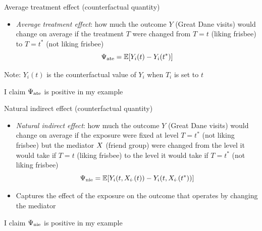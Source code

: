 \documentclass{beamer}
\theoremstyle{remark}
\begin{document}
\begin{frame}{Average treatment effect (counterfactual quantity)}

    \begin{itemize}
        \item \emph{Average treatment effect}: how much the outcome $Y$ (Great Dane visits) would change on average if the treatment $T$ were changed from $T = t$ (liking frisbee) to $T = t^*$ (not liking frisbee)
              \begin{equation*}
                  \ate = \E{Y_i(t) - Y_i(t^*)}
              \end{equation*}
    \end{itemize}

    Note: $Y_i(t)$ is the counterfactual value of $Y_i$ when $T_i$ is set to $t$

    I claim $\Psi_\mathrm{ate}$ is positive in my example

\end{frame}


\begin{frame}{Natural indirect effect (counterfactual quantity)}

    \begin{itemize}
        \item \emph{Natural indirect effect}: how much the outcome $Y$ (Great Dane visits) would change on average if the exposure were fixed at level $T = t^*$ (not liking frisbee) but the mediator $X$ (friend group) were changed from the level it would take if $T = t$ (liking frisbee) to the level it would take if $T = t^*$ (not liking frisbee)
              \begin{equation*}
                  \nie = \E{Y_i (t, \X_{i \cdot}(t)) - Y_i (t, \X_{i \cdot} (t^*))}
              \end{equation*}
        \item Captures the effect of the exposure on the outcome that operates by changing the mediator
    \end{itemize}

    I claim $\Psi_\mathrm{nie}$ is positive in my example

\end{frame}
\end{document}
